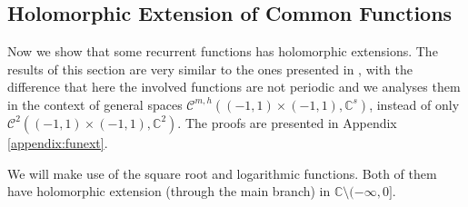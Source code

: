 \documentclass{article}
\newcommand{\IC}{{\mathbb C}}
\newcommand{\cmspace}[3]{\mathcal{C}^{#1} \left( #2, #3 \right)}
\newcommand{\cmspaceh}[4]{\mathcal{C}^{#1,#2} \left( #3, #4 \right)}
\newcommand{\iinterv}{(-1,1)\times(-1,1)}
\begin{document}
\subsection{Holomorphic Extension of Common Functions}
\label{sec:funext}
Now we show that some recurrent functions has holomorphic extensions. The results of this section are very similar to the ones presented  in \cite{Henriquez2021}, with the difference that here the involved functions are not periodic and we analyses them in the context of general spaces $\cmspaceh{m}{h}{\iinterv}{\IC^s}$, instead of only $\cmspace{2}{\iinterv}{\IC^2}$. The proofs are presented in Appendix \ref{appendix:funext}.

We will make use of the square root and logarithmic functions. Both of them have holomorphic extension (through the main branch) in $\IC \setminus (-\infty,0]$.
\end{document}
